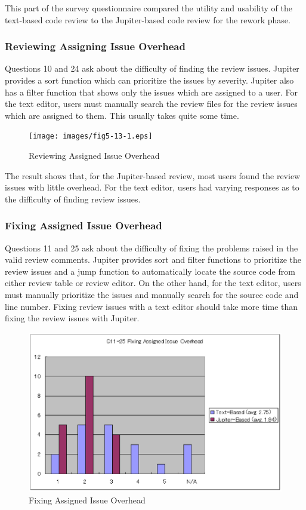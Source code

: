 This part of the survey questionnaire compared the utility and usability of the text-based code review to the Jupiter-based code review for the rework phase.

\subsubsection{Reviewing Assigning Issue Overhead}
\label{subsubsec:reviewing-assigning-issue-overhead}

Questions 10 and 24 ask about the difficulty of finding the review issues. Jupiter provides a sort function which can prioritize the issues by severity. Jupiter also has a filter function that shows only the issues which are assigned to a user. For the text editor, users must manually search the review files for the review issues which are assigned to them. This usually takes quite some time.

\begin{figure}[htbp]
  \centering
  \texttt{[image: images/fig5-13-1.eps]}
  \caption{Reviewing Assigned Issue Overhead}
  \label{fig5-13}
\end{figure}

The result shows that, for the Jupiter-based review, most users found the review issues with little overhead. For the text editor, users had varying responses as to the difficulty of finding review issues.

\subsubsection{Fixing Assigned Issue Overhead}
\label{subsubsec:fixing-assigned-issue-overhead}

Questions 11 and 25 ask about the difficulty of fixing the problems raised in the valid review comments. Jupiter provides sort and filter functions to prioritize the review issues and a jump function to automatically locate the source code from either review table or review editor. On the other hand, for the text editor, users must manually prioritize the issues and manually search for the source code and line number. Fixing review issues with a text editor should take more time than fixing the review issues with Jupiter.

\begin{figure}[htbp]
  \centering
  \includegraphics{images/fig5-14.eps}
  \caption{Fixing Assigned Issue Overhead}
  \label{fig5-14}
\end{figure}

